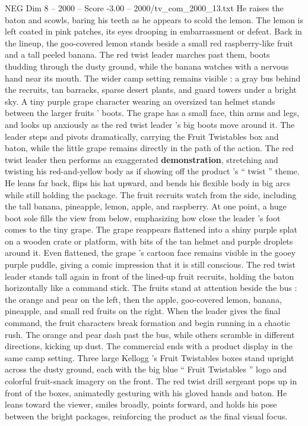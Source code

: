 \begin{textsample}{NEG Dim 8 – 2000 – Score -3.00 – 2000/tv\_com\_2000\_13.txt}
He raises the baton and scowls, baring his teeth as he appears to scold the lemon.
The lemon is left coated in pink patches, its eyes drooping in embarrassment or defeat.
Back in the lineup, the goo-covered lemon stands beside a small red raspberry-like fruit and a tall peeled banana.
The red twist leader marches past them, boots thudding through the dusty ground, while the banana watches with a nervous hand near its mouth.
The wider camp setting remains visible : a gray bus behind the recruits, tan barracks, sparse desert plants, and guard towers under a bright sky.
A tiny purple grape character wearing an oversized tan helmet stands between the larger fruits ’ boots.
The grape has a small face, thin arms and legs, and looks up anxiously as the red twist leader ’s big boots move around it.
The leader steps and pivots dramatically, carrying the Fruit Twistables box and baton, while the little grape remains directly in the path of the action.
The red twist leader then performs an exaggerated \textbf{demonstration}, stretching and twisting his red-and-yellow body as if showing off the product ’s “ twist ” theme.
He leans far back, flips his hat upward, and bends his flexible body in big arcs while still holding the package.
The fruit recruits watch from the side, including the tall banana, pineapple, lemon, apple, and raspberry.
At one point, a huge boot sole fills the view from below, emphasizing how close the leader ’s foot comes to the tiny grape.
The grape reappears flattened into a shiny purple splat on a wooden crate or platform, with bits of the tan helmet and purple droplets around it.
Even flattened, the grape ’s cartoon face remains visible in the gooey purple puddle, giving a comic impression that it is still conscious.
The red twist leader stands tall again in front of the lined-up fruit recruits, holding the baton horizontally like a command stick.
The fruits stand at attention beside the bus : the orange and pear on the left, then the apple, goo-covered lemon, banana, pineapple, and small red fruits on the right.
When the leader gives the final command, the fruit characters break formation and begin running in a chaotic rush.
The orange and pear dash past the bus, while others scramble in different directions, kicking up dust.
The commercial ends with a product display in the same camp setting.
Three large Kellogg ’s Fruit Twistables boxes stand upright across the dusty ground, each with the big blue “ Fruit Twistables ” logo and colorful fruit-snack imagery on the front.
The red twist drill sergeant pops up in front of the boxes, animatedly gesturing with his gloved hands and baton.
He leans toward the viewer, smiles broadly, points forward, and holds his pose between the bright packages, reinforcing the product as the final visual focus.

\end{textsample}
